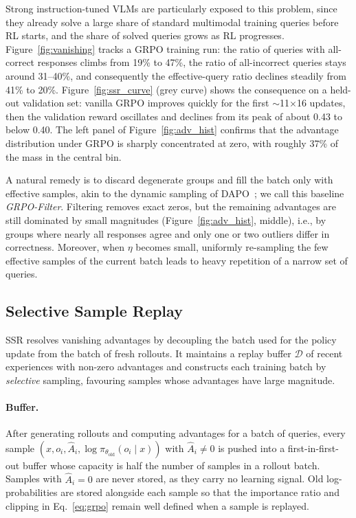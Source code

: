 \documentclass{article}
\begin{document}
Strong instruction-tuned VLMs are particularly exposed to this problem, since they already solve a large share of standard multimodal training queries before RL starts, and the share of solved queries grows as RL progresses. Figure~\ref{fig:vanishing} tracks a GRPO training run: the ratio of queries with all-correct responses climbs from 19\% to 47\%, the ratio of all-incorrect queries stays around 31--40\%, and consequently the effective-query ratio declines steadily from 41\% to 20\%. Figure~\ref{fig:ssr_curve} (grey curve) shows the consequence on a held-out validation set: vanilla GRPO improves quickly for the first $\sim$11$\times$16 updates, then the validation reward oscillates and declines from its peak of about 0.43 to below 0.40. The left panel of Figure~\ref{fig:adv_hist} confirms that the advantage distribution under GRPO is sharply concentrated at zero, with roughly 37\% of the mass in the central bin.

A natural remedy is to discard degenerate groups and fill the batch only with effective samples, akin to the dynamic sampling of DAPO~\citep{dapo}; we call this baseline \emph{GRPO-Filter}. Filtering removes exact zeros, but the remaining advantages are still dominated by small magnitudes (Figure~\ref{fig:adv_hist}, middle), i.e., by groups where nearly all responses agree and only one or two outliers differ in correctness. Moreover, when $\eta$ becomes small, uniformly re-sampling the few effective samples of the current batch leads to heavy repetition of a narrow set of queries.

\subsection{Selective Sample Replay}
\label{sec:ssr}

SSR resolves vanishing advantages by decoupling the batch used for the policy update from the batch of fresh rollouts. It maintains a replay buffer $\mathcal{D}$ of recent experiences with non-zero advantages and constructs each training batch by \emph{selective} sampling, favouring samples whose advantages have large magnitude.

\paragraph{Buffer.} After generating rollouts and computing advantages for a batch of queries, every sample $(x, o_i, \hat{A}_i, \log\pi_{\theta_\mathrm{old}}(o_i\mid x))$ with $\hat{A}_i\neq 0$ is pushed into a first-in-first-out buffer whose capacity is half the number of samples in a rollout batch. Samples with $\hat{A}_i=0$ are never stored, as they carry no learning signal. Old log-probabilities are stored alongside each sample so that the importance ratio and clipping in Eq.~\eqref{eq:grpo} remain well defined when a sample is replayed.
\end{document}
